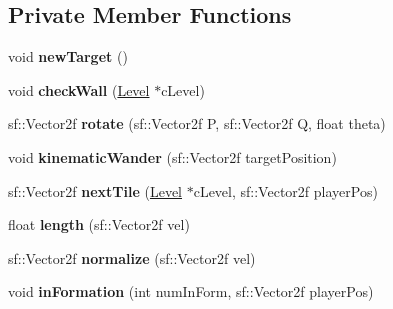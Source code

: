 \subsection*{Private Member Functions}
\begin{DoxyCompactItemize}
\item 
\mbox{\label{class_predator___ship_ac1953d8f1f581219dc5ac8cbe2166ead}} 
void {\bfseries new\+Target} ()
\item 
\mbox{\label{class_predator___ship_acdc3d20c03731ead7f0f3e07fcca6231}} 
void {\bfseries check\+Wall} (\mbox{\hyperlink{class_level}{Level}} $\ast$c\+Level)
\item 
\mbox{\label{class_predator___ship_aa94d873c392291d03ebd4e04750e6c9c}} 
sf\+::\+Vector2f {\bfseries rotate} (sf\+::\+Vector2f P, sf\+::\+Vector2f Q, float theta)
\item 
\mbox{\label{class_predator___ship_a26f117f575ed46b73789e794a105cee4}} 
void {\bfseries kinematic\+Wander} (sf\+::\+Vector2f target\+Position)
\item 
\mbox{\label{class_predator___ship_abc955e49984bac9a0f70aa37c1f028ee}} 
sf\+::\+Vector2f {\bfseries next\+Tile} (\mbox{\hyperlink{class_level}{Level}} $\ast$c\+Level, sf\+::\+Vector2f player\+Pos)
\item 
\mbox{\label{class_predator___ship_abe2c4efa6647cff94b3821c66da58376}} 
float {\bfseries length} (sf\+::\+Vector2f vel)
\item 
\mbox{\label{class_predator___ship_a4e5b670464b01250b2d2e2e3de575e85}} 
sf\+::\+Vector2f {\bfseries normalize} (sf\+::\+Vector2f vel)
\item 
\mbox{\label{class_predator___ship_ac831147851a25408a83145f481aafbd0}} 
void {\bfseries in\+Formation} (int num\+In\+Form, sf\+::\+Vector2f player\+Pos)
\end{DoxyCompactItemize}
